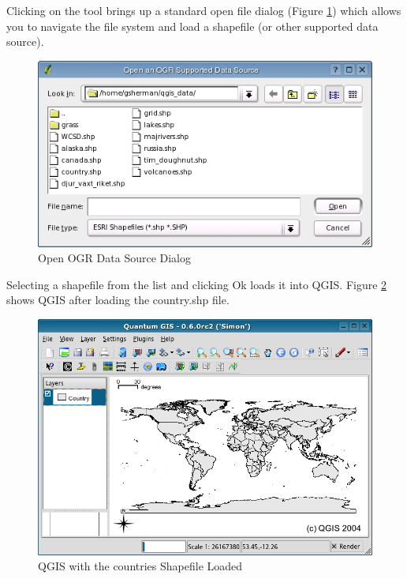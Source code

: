 Clicking on the tool brings up a standard open file dialog (Figure \ref{fig:openshapefile}) which allows you to navigate the file system and load a shapefile (or other supported data source). 
\begin{figure}[h]
   \begin{center}
   \caption{Open OGR Data Source Dialog}\label{fig:openshapefile}\smallskip
   \includegraphics[scale=.75]{qgis_user_guide_images/shapefileopendialog}
\end{center}  
   
\end{figure}
Selecting a shapefile from the list and clicking Ok loads it into QGIS. Figure \ref{fig:loadedshapefile}
shows QGIS after loading the country.shp file.
\begin{figure}[h]
   \begin{center}
   \caption{QGIS with the countries Shapefile Loaded}\label{fig:loadedshapefile}\smallskip
   \includegraphics[scale=.6]{qgis_user_guide_images/shapefileloaded}
\end{center}  
   
\end{figure}
\begin{Tip}\caption{\textsc{Layer Colors}}
\end{Tip}

